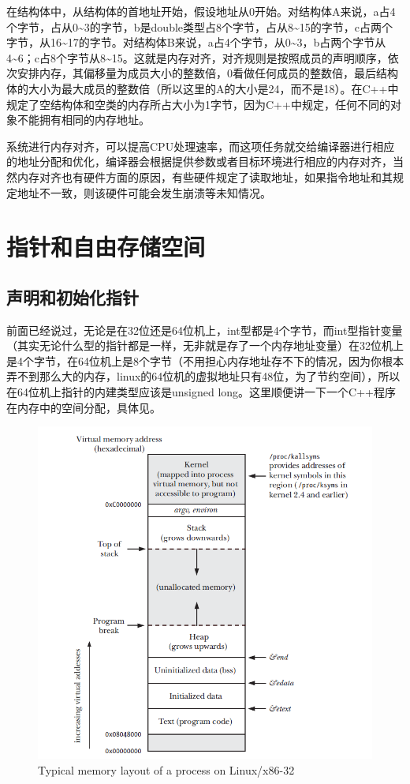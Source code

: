 在结构体中，从结构体的首地址开始，假设地址从0开始。对结构体A来说，a占4个字节，占从0\~{}3的字节，b是double类型占8个字节，占从8\~{}15的字节，c占两个字节，从16\~{}17的字节。对结构体B来说，a占4个字节，从0\~{}3，b占两个字节从4\~{}6；c占8个字节从8\~{}15。这就是内存对齐，对齐规则是按照成员的声明顺序，依次安排内存，其偏移量为成员大小的整数倍，0看做任何成员的整数倍，最后结构体的大小为最大成员的整数倍（所以这里的A的大小是24，而不是18）。在C++中规定了空结构体和空类的内存所占大小为1字节，因为C++中规定，任何不同的对象不能拥有相同的内存地址。

系统进行内存对齐，可以提高CPU处理速率，而这项任务就交给编译器进行相应的地址分配和优化，编译器会根据提供参数或者目标环境进行相应的内存对齐，当然内存对齐也有硬件方面的原因，有些硬件规定了读取地址，如果指令地址和其规定地址不一致，则该硬件可能会发生崩溃等未知情况。

\addtocounter{section}{2}

\section{指针和自由存储空间}

\subsection{声明和初始化指针}

前面已经说过，无论是在32位还是64位机上，int型都是4个字节，而int型指针变量（其实无论什么型的指针都是一样，无非就是存了一个内存地址变量）在32位机上是4个字节，在64位机上是8个字节（不用担心内存地址存不下的情况，因为你根本弄不到那么大的内存，linux的64位机的虚拟地址只有48位，为了节约空间），所以在64位机上指针的内建类型应该是unsigned long。这里顺便讲一下一个C++程序在内存中的空间分配，具体见\cite{LinuxProgram}。

\begin{figure}[!hbt]
\centering
\includegraphics[scale=0.9]{./Figures/RAM}
\caption{Typical memory layout of a process on Linux/x86-32}
\label{figure:RAM}
\end{figure}

